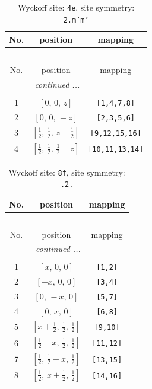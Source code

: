 \documentclass[fleqn,8pt]{jsarticle}
\begin{document}
\renewcommand{\arraystretch}{1.2}
\begin{longtable}{ccc}
\caption{Wyckoff site: {\tt 4e}, site symmetry: {\tt 2.m'm'}}
 \\
 \hline \hline
No. & position & mapping \\ \hline \endfirsthead

\multicolumn{2}{l}{\tablename\ \thetable{}} \\
 \hline \hline
No. & position & mapping \\ \hline \endhead

 \hline \hline
\multicolumn{2}{r}{\footnotesize\it continued ...} \\ \endfoot

 \hline \hline
\multicolumn{2}{r}{} \\ \endlastfoot

1 & $\left[ 0,\, 0,\, z \right]$ & {\tt [1,4,7,8]} \\ \hline
2 & $\left[ 0,\, 0,\, - z \right]$ & {\tt [2,3,5,6]} \\ \hline
3 & $\left[ \frac{1}{2},\, \frac{1}{2},\, z + \frac{1}{2} \right]$ & {\tt [9,12,15,16]} \\ \hline
4 & $\left[ \frac{1}{2},\, \frac{1}{2},\, \frac{1}{2} - z \right]$ & {\tt [10,11,13,14]} \\
\end{longtable}
\renewcommand{\arraystretch}{1.2}
\begin{longtable}{ccc}
\caption{Wyckoff site: {\tt 8f}, site symmetry: {\tt .2.}}
 \\
 \hline \hline
No. & position & mapping \\ \hline \endfirsthead

\multicolumn{2}{l}{\tablename\ \thetable{}} \\
 \hline \hline
No. & position & mapping \\ \hline \endhead

 \hline \hline
\multicolumn{2}{r}{\footnotesize\it continued ...} \\ \endfoot

 \hline \hline
\multicolumn{2}{r}{} \\ \endlastfoot

1 & $\left[ x,\, 0,\, 0 \right]$ & {\tt [1,2]} \\ \hline
2 & $\left[ - x,\, 0,\, 0 \right]$ & {\tt [3,4]} \\ \hline
3 & $\left[ 0,\, - x,\, 0 \right]$ & {\tt [5,7]} \\ \hline
4 & $\left[ 0,\, x,\, 0 \right]$ & {\tt [6,8]} \\ \hline
5 & $\left[ x + \frac{1}{2},\, \frac{1}{2},\, \frac{1}{2} \right]$ & {\tt [9,10]} \\ \hline
6 & $\left[ \frac{1}{2} - x,\, \frac{1}{2},\, \frac{1}{2} \right]$ & {\tt [11,12]} \\ \hline
7 & $\left[ \frac{1}{2},\, \frac{1}{2} - x,\, \frac{1}{2} \right]$ & {\tt [13,15]} \\ \hline
8 & $\left[ \frac{1}{2},\, x + \frac{1}{2},\, \frac{1}{2} \right]$ & {\tt [14,16]} \\
\end{longtable}
\end{document}
